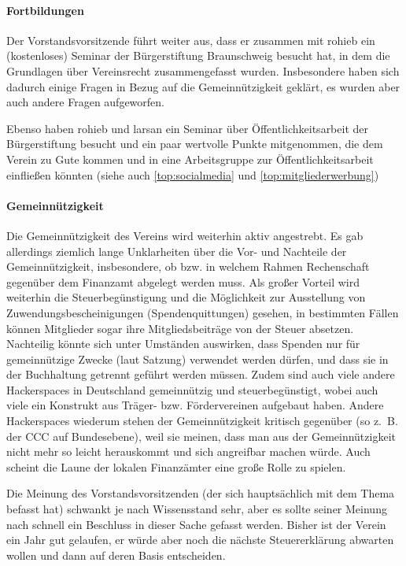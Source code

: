 \documentclass[a4paper,12pt]{scrartcl}
\begin{document}
\paragraph{Fortbildungen}
Der Vorstandsvorsitzende führt weiter aus, dass er zusammen mit rohieb ein
(kostenloses) Seminar der Bürgerstiftung Braunschweig besucht hat, in dem die
Grundlagen über Vereinsrecht zusammengefasst wurden. Insbesondere haben sich
dadurch einige Fragen in Bezug auf die Gemeinnützigkeit geklärt, es wurden aber
auch andere Fragen aufgeworfen.

Ebenso haben rohieb und larsan ein Seminar über Öffentlichkeitsarbeit der
Bürgerstiftung besucht und ein paar wertvolle Punkte mitgenommen, die dem Verein
zu Gute kommen und in eine Arbeitsgruppe zur Öffentlichkeitsarbeit
einfließen könnten (siehe auch \ref{top:socialmedia} und
\ref{top:mitgliederwerbung})

\paragraph{Gemeinnützigkeit}
Die Gemeinnützigkeit des Vereins wird weiterhin aktiv angestrebt. Es gab
allerdings ziemlich lange Unklarheiten über die Vor- und Nachteile der
Gemeinnützigkeit, insbesondere, ob bzw. in welchem Rahmen Rechenschaft gegenüber
dem Finanzamt abgelegt werden muss. Als großer Vorteil wird weiterhin die
Steuerbegünstigung und die Möglichkeit zur Ausstellung von
Zuwendungsbescheinigungen (Spendenquittungen) gesehen, in bestimmten Fällen
können Mitglieder sogar ihre Mitgliedsbeiträge von der Steuer absetzen.
Nachteilig könnte sich unter Umständen auswirken, dass Spenden nur für
gemeinnützige Zwecke (laut Satzung) verwendet werden dürfen, und dass sie in der
Buchhaltung getrennt geführt werden müssen. Zudem sind auch viele andere
Hackerspaces in Deutschland gemeinnützig und steuerbegünstigt, wobei auch viele
ein Konstrukt aus Träger- bzw. Fördervereinen aufgebaut haben. Andere
Hackerspaces wiederum stehen der Gemeinnützigkeit kritisch gegenüber (so z.~B.
der CCC auf Bundesebene), weil sie meinen, dass man aus der Gemeinnützigkeit
nicht mehr so leicht herauskommt und sich angreifbar machen würde. Auch scheint
die Laune der lokalen Finanzämter eine große Rolle zu spielen.

Die Meinung des Vorstandsvorsitzenden (der sich hauptsächlich mit dem Thema
befasst hat) schwankt je nach Wissensstand sehr, aber es sollte seiner Meinung
nach schnell ein Beschluss in dieser Sache gefasst werden. Bisher ist der Verein
ein Jahr gut gelaufen, er würde aber noch die nächste Steuererklärung abwarten
wollen und dann auf deren Basis entscheiden.
\end{document}

